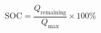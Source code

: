 \documentclass[preview]{standalone}
\begin{document}
\[\text{SOC} = \frac{Q_\text{remaining}}{Q_\text{max}} \times 100\% \tag{3.6}\]
\end{document}
